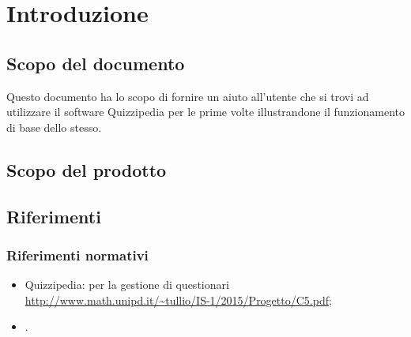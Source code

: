 \documentclass[a4paper, titlepage]{article}
\begin{document}
	
	\pagestyle{fancy}	
	
	\maketitle
	
	
	
	\newpage
	\tableofcontents
	\newpage
	\listoffigures
	
	\newpage
	\clearpage	
	\hypersetup{linkcolor=blue}
	
	\section{Introduzione}
	\subsection{Scopo del documento}
	Questo documento ha lo scopo di fornire un aiuto all'utente che si trovi ad utilizzare il software
	Quizzipedia per le prime volte illustrandone il funzionamento di base dello stesso.
	
	\subsection{Scopo del prodotto}
	\SCOPO
	
	\subsection{Riferimenti}	
	\subsubsection{Riferimenti normativi}
	\begin{itemize}
		\item {} Quizzipedia:  per la gestione di questionari \newline \url{http://www.math.unipd.it/~tullio/IS-1/2015/Progetto/C5.pdf};
		\item {} \NdPdoc.
	\end{itemize}
	\newpage
	
\end{document}
